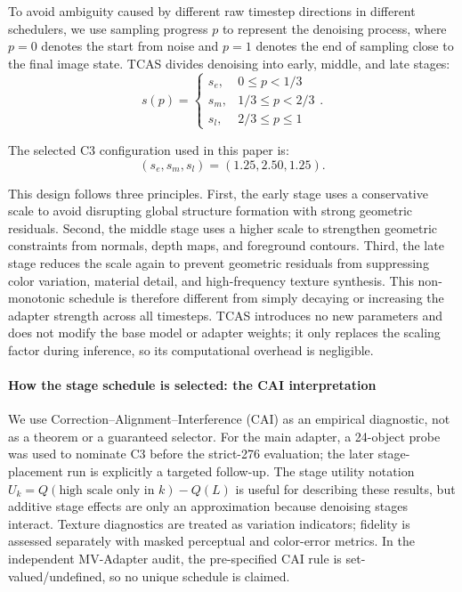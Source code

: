 \documentclass[times,twocolumn,final]{elsarticle}
\begin{document}
To avoid ambiguity caused by different raw timestep directions in different schedulers, we use sampling progress $p$ to represent the denoising process, where $p = 0$ denotes the start from noise and $p = 1$ denotes the end of sampling close to the final image state. TCAS divides denoising into early, middle, and late stages:
\begin{equation}
s(p) = \begin{cases} s_e, & 0 \leq p < 1/3 \\ s_m, & 1/3 \leq p < 2/3 \\ s_l, & 2/3 \leq p \leq 1 \end{cases}.
\label{eq:tcas}
\end{equation}

The selected C3 configuration used in this paper is:
\begin{equation}
(s_e, s_m, s_l) = (1.25, 2.50, 1.25).
\end{equation}

This design follows three principles. First, the early stage uses a conservative scale to avoid disrupting global structure formation with strong geometric residuals. Second, the middle stage uses a higher scale to strengthen geometric constraints from normals, depth maps, and foreground contours. Third, the late stage reduces the scale again to prevent geometric residuals from suppressing color variation, material detail, and high-frequency texture synthesis. This non-monotonic schedule is therefore different from simply decaying or increasing the adapter strength across all timesteps. TCAS introduces no new parameters and does not modify the base model or adapter weights; it only replaces the scaling factor during inference, so its computational overhead is negligible.

\paragraph{How the stage schedule is selected: the CAI interpretation}
We use Correction--Alignment--Interference (CAI) as an empirical diagnostic, not as a theorem or a guaranteed selector. For the main adapter, a 24-object probe was used to nominate C3 before the strict-276 evaluation; the later stage-placement run is explicitly a targeted follow-up. The stage utility notation $U_k=Q(\text{high scale only in }k)-Q(L)$ is useful for describing these results, but additive stage effects are only an approximation because denoising stages interact. Texture diagnostics are treated as variation indicators; fidelity is assessed separately with masked perceptual and color-error metrics. In the independent MV-Adapter audit, the pre-specified CAI rule is set-valued/undefined, so no unique schedule is claimed.
\end{document}

